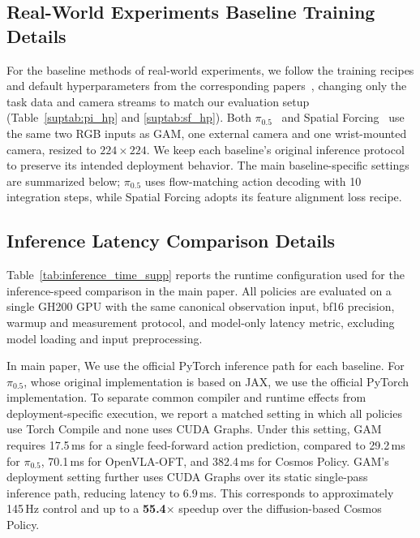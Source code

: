 

\subsection{Real-World Experiments Baseline Training Details}
\label{sec:appendix-baseline_training}

For the baseline methods of real-world experiments, we follow the training recipes and default hyperparameters from the corresponding papers~\cite{li2025spatial, pi05}, changing only the task data and camera streams to match our evaluation setup (Table~\ref{suptab:pi_hp} and \ref{suptab:sf_hp}). Both $\pi_{0.5}$~\cite{pi05} and Spatial Forcing~\cite{li2025spatial} use the same two RGB inputs as GAM, one external camera and one wrist-mounted camera, resized to \(224\times224\). We keep each baseline's original inference protocol to preserve its intended deployment behavior. The main baseline-specific settings are summarized below; $\pi_{0.5}$ uses flow-matching action decoding with 10 integration steps, while Spatial Forcing adopts its feature alignment loss recipe.

\subsection{Inference Latency Comparison Details}
\label{sec:appendix-inference_details}

Table~\ref{tab:inference_time_supp} reports the runtime configuration used for the inference-speed comparison in the main paper. 
All policies are evaluated on a single GH200 GPU with the same canonical observation input, bf16 precision, warmup and measurement protocol, and model-only latency metric, excluding model loading and input preprocessing. 

In main paper, We use the official PyTorch inference path for each baseline. For $\pi_{0.5}$, whose original implementation is based on JAX, we use the official PyTorch implementation. To separate common compiler and runtime effects from deployment-specific execution, we report a matched setting in which all policies use Torch Compile and none uses CUDA Graphs.
Under this setting, GAM requires 17.5\,ms for a single feed-forward action prediction, compared to 29.2\,ms for $\pi_{0.5}$, 70.1\,ms for OpenVLA-OFT, and 382.4\,ms for Cosmos Policy. 
GAM's deployment setting further uses CUDA Graphs over its static single-pass inference path, reducing latency to 6.9\,ms. This corresponds to approximately 145\,Hz control and up to a \textbf{55.4}$\times$ speedup over the diffusion-based Cosmos Policy.


